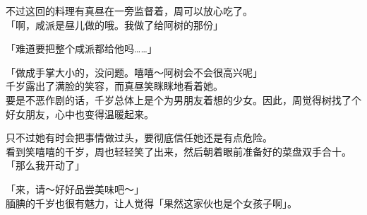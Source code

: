 不过这回的料理有真昼在一旁监督着，周可以放心吃了。\\

「啊，咸派是昼儿做的哦。我做了给阿树的那份」

「难道要把整个咸派都给他吗……」

「做成手掌大小的，没问题。嘻嘻～阿树会不会很高兴呢」\\

千岁露出了满脸的笑容，而真昼笑眯眯地看着她。\\

要是不恶作剧的话，千岁总体上是个为男朋友着想的少女。因此，周觉得树找了个好女朋友，心中也变得温暖起来。

只不过她有时会把事情做过头，要彻底信任她还是有点危险。\\

看到笑嘻嘻的千岁，周也轻轻笑了出来，然后朝着眼前准备好的菜盘双手合十。\\

「那么我开动了」

「来，请～好好品尝美味吧～」\\

腼腆的千岁也很有魅力，让人觉得「果然这家伙也是个女孩子啊」。
